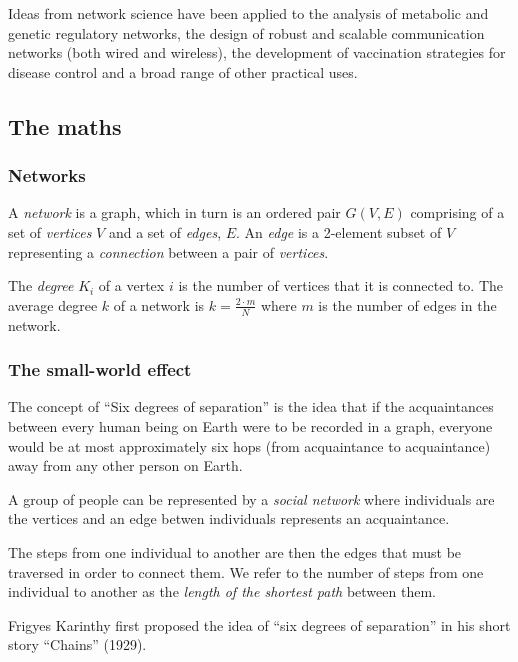 \documentclass[a4paper,11pt,titlepage]{article}
\begin{document}
Ideas from network science have been applied to the analysis of metabolic and
genetic regulatory networks, the design of robust and scalable communication
networks (both wired and wireless), the development of vaccination strategies
for disease control and a broad range of other practical
uses. \cite{complexNets}

\subsection{The maths}


\subsubsection{Networks}

A \emph{network} is a graph, which in turn is an ordered pair $G(V,E)$
comprising of a set of \emph{vertices} $V$ and a set of \emph{edges}, $E$.
An \emph{edge} is a 2-element subset of $V$ representing a
\emph{connection} between a pair of \emph{vertices}.

The \emph{degree} $K_i$ of a vertex $i$ is the number of vertices that it is
connected to. The average degree $k$ of a network is $k =\frac{2 \cdot m}{N}$
where $m$ is the number of edges in the network.

\subsubsection{The small-world effect}

The concept of ``Six degrees of separation'' is the idea that if the
acquaintances between every human being on Earth were to be recorded
in a graph, everyone would be at most approximately six hops (from
acquaintance to acquaintance) away from any other person on Earth.

A group of people can be represented by a \emph{social network} where
individuals are the vertices and an edge betwen individuals represents
an acquaintance.

The steps from one individual to another are then the edges that must be
traversed in order to connect them. We refer to the number of steps from
one individual to another as the \emph{length of the shortest path} between
them.

Frigyes Karinthy first proposed the idea of ``six degrees of separation''
in his short story ``Chains'' (1929).
\end{document}
